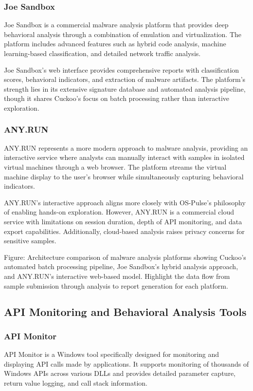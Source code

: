\subsubsection{Joe Sandbox}
Joe Sandbox is a commercial malware analysis platform that provides deep behavioral analysis through a combination of emulation and virtualization. The platform includes advanced features such as hybrid code analysis, machine learning-based classification, and detailed network traffic analysis.

Joe Sandbox's web interface provides comprehensive reports with classification scores, behavioral indicators, and extraction of malware artifacts. The platform's strength lies in its extensive signature database and automated analysis pipeline, though it shares Cuckoo's focus on batch processing rather than interactive exploration.

\subsubsection{ANY.RUN}
ANY.RUN represents a more modern approach to malware analysis, providing an interactive service where analysts can manually interact with samples in isolated virtual machines through a web browser. The platform streams the virtual machine display to the user's browser while simultaneously capturing behavioral indicators.

ANY.RUN's interactive approach aligns more closely with OS-Pulse's philosophy of enabling hands-on exploration. However, ANY.RUN is a commercial cloud service with limitations on session duration, depth of API monitoring, and data export capabilities. Additionally, cloud-based analysis raises privacy concerns for sensitive samples.

{{Figure: Architecture comparison of malware analysis platforms showing Cuckoo's automated batch processing pipeline, Joe Sandbox's hybrid analysis approach, and ANY.RUN's interactive web-based model. Highlight the data flow from sample submission through analysis to report generation for each platform.}}

\subsection{API Monitoring and Behavioral Analysis Tools}

\subsubsection{API Monitor}
API Monitor is a Windows tool specifically designed for monitoring and displaying API calls made by applications. It supports monitoring of thousands of Windows APIs across various DLLs and provides detailed parameter capture, return value logging, and call stack information.

